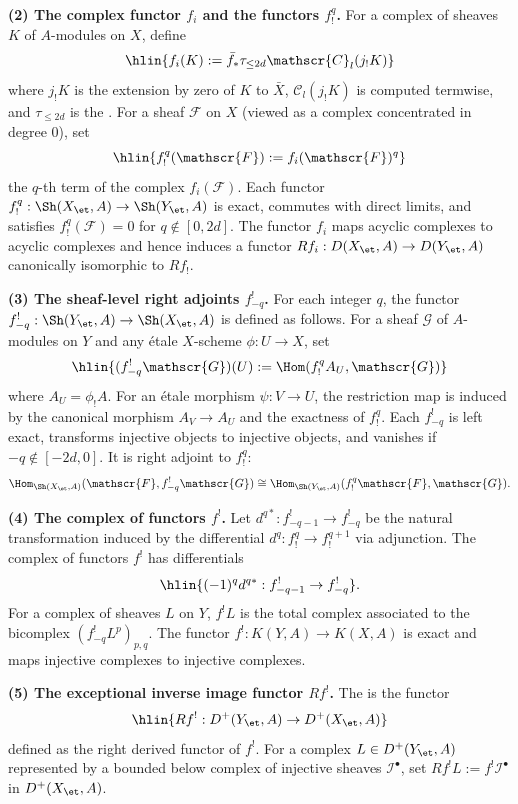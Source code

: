 \begin{definition}
    \textbf{(2) The complex functor $f_i$ and the functors $f_!^q$.} For a complex of sheaves $K$ of $A$-modules on $X$, define
    $$\hlin{f_i(K) := \bar{f}_* \tau_{\leq 2d} \mathscr{C}_l(j_! K)}$$
    where $j_! K$ is the extension by zero of $K$ to $\bar{X}$, $\mathscr{C}_l(j_! K)$ is computed termwise, and $\tau_{\leq 2d}$ is the . For a sheaf $\mathscr{F}$ on $X$ (viewed as a complex concentrated in degree $0$), set
    $$\hlin{f_!^q(\mathscr{F}) := f_i(\mathscr{F})^q}$$
    the $q$-th term of the complex $f_i(\mathscr{F})$. Each functor $f_!^q: \Sh(X_{\et}, A) \to \Sh(Y_{\et}, A)$ is exact, commutes with direct limits, and satisfies $f_!^q(\mathscr{F}) = 0$ for $q \notin [0, 2d]$. The functor $f_i$ maps acyclic complexes to acyclic complexes and hence induces a functor $Rf_i: D(X_{\et}, A) \to D(Y_{\et}, A)$ canonically isomorphic to $Rf_!$.

    \textbf{(3) The sheaf-level right adjoints $f_{-q}^!$.} For each integer $q$, the functor $f_{-q}^!: \Sh(Y_{\et}, A) \to \Sh(X_{\et}, A)$ is defined as follows. For a sheaf $\mathscr{G}$ of $A$-modules on $Y$ and any \'etale $X$-scheme $\phi: U \to X$, set
    $$\hlin{(f_{-q}^! \mathscr{G})(U) := \Hom(f_!^q A_U, \mathscr{G})}$$
    where $A_U = \phi_! A$. For an \'etale morphism $\psi: V \to U$, the restriction map is induced by the canonical morphism $A_V \to A_U$ and the exactness of $f_!^q$. Each $f_{-q}^!$ is left exact, transforms injective objects to injective objects, and vanishes if $-q \notin [-2d, 0]$. It is right adjoint to $f_!^q$:
    $$\Hom_{\Sh(X_{\et}, A)}(\mathscr{F}, f_{-q}^! \mathscr{G}) \cong \Hom_{\Sh(Y_{\et}, A)}(f_!^q \mathscr{F}, \mathscr{G}).$$

    \textbf{(4) The complex of functors $f^!$.} Let $d^{q*}: f_{-q-1}^! \to f_{-q}^!$ be the natural transformation induced by the differential $d^q: f_!^q \to f_!^{q+1}$ via adjunction. The complex of functors $f^!$ has differentials
    $$\hlin{(-1)^q d^{q*}: f_{-q-1}^! \to f_{-q}^!}.$$
    For a complex of sheaves $L$ on $Y$, $f^! L$ is the total complex associated to the bicomplex $(f_{-q}^! L^p)_{p,q}$. The functor $f^!: K(Y, A) \to K(X, A)$ is exact and maps injective complexes to injective complexes.

    \textbf{(5) The exceptional inverse image functor $Rf^!$.} The  is the functor
    $$\hlin{Rf^!: D^+(Y_{\et}, A) \to D^+(X_{\et}, A)}$$
     defined as the right derived functor of $f^!$. For a complex $L \in D^+(Y_{\et}, A)$ represented by a bounded below complex of injective sheaves $\mathcal{I}^\bullet$, set $Rf^! L := f^! \mathcal{I}^\bullet$ in $D^+(X_{\et}, A)$.


\end{definition}
